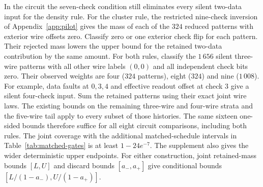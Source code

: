 \documentclass[10pt,twocolumn]{article}
\theoremstyle{definition}
\begin{document}
In the circuit the seven-check condition still eliminates every
silent two-data input for the density rule. For the cluster rule,
the restricted nine-check inversion of Appendix~\ref{app:pilot}
gives the mass of each of the $324$ reduced patterns with exterior
wire offsets zero. Classify zero or one exterior check flip for
each pattern. Their rejected mass lowers the upper bound for the
retained two-data contribution by the same amount. For both rules,
classify the $1\,656$ silent three-wire patterns with all other wire
labels $(0,0)$ and all independent check bits zero.
Their observed weights are four ($324$ patterns), eight ($324$) and
nine ($1\,008$). For example, data faults at $0,3,4$ and effective
readout offset at check $3$ give a silent four-check input.
Sum the retained patterns using their exact joint wire laws.
The existing bounds on the remaining three-wire and four-wire
strata and the five-wire tail apply to every subset of those
histories. The same sixteen one-sided bounds therefore suffice for
all eight circuit comparisons, including both rules. The
joint coverage with the additional matched-schedule intervals in
Table~\ref{tab:matched-gates} is at least $1-24e^{-7}$.
The supplement also gives the wider deterministic upper endpoints.
For either construction, joint retained-mass bounds $[L,U]$ and
discard bounds $[a_-,a_+]$ give conditional bounds
$[L/(1-a_-),U/(1-a_+)]$.
\end{document}
